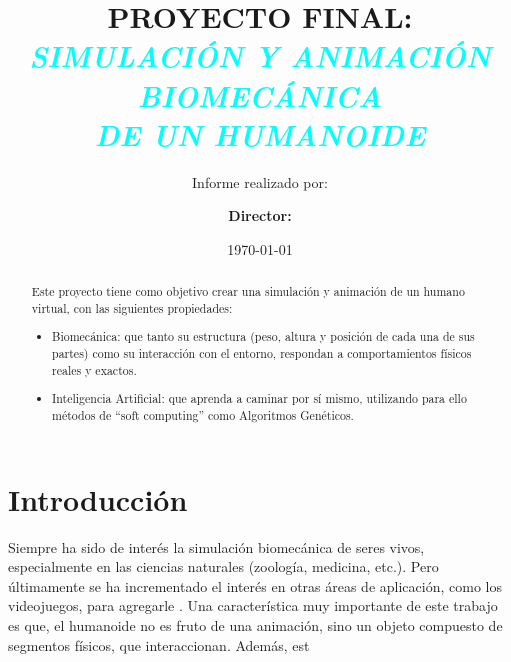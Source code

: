 \documentclass{article}
\title{\textbf{PROYECTO FINAL: \\ \vspace*{2ex} \textcolor{cyan}{\textit{SIMULACI\'ON Y ANIMACI\'ON BIOMEC\'ANICA \\DE UN HUMANOIDE}  }  \vspace*{3ex}} } %
\author{Informe realizado por: }
\affil{Altamiranda Graterol, Enzo\\%
\url{ealtamir@itba.edu.ar}}
\affil{Fontanella De Santis, Teresa\\
\url{tfontane@itba.edu.ar}}
\affil{Mehdi, Tom\'as\\
\url{tmehdi@itba.edu.ar}\vspace*{3ex}}
\author{\textbf{Director:}}
\affil{ \textbf{Dr. PARISI, Daniel Ricardo} \vspace*{3ex}}
\date{\today} %
\begin{document}

\maketitle %
\thispagestyle{empty} %

\newpage
\tableofcontents
\newpage

 \begin{abstract}
 
\noindent

\begin{adjustwidth}{1.05cm}{0cm}
Este proyecto tiene como objetivo crear una simulaci\'on y animaci\'on de un humano virtual, con las siguientes propiedades:
\begin{itemize}[leftmargin=5.5mm]
\item Biomec\'anica: que tanto su estructura (peso, altura y posici\'on de cada una de sus partes) como su interacci\'on con el entorno, respondan a comportamientos f\'isicos reales y exactos.
\item Inteligencia Artificial: que aprenda a caminar por s\'i mismo, utilizando para ello m\'etodos de ``soft computing'' como Algoritmos Gen\'eticos.
\end{itemize}

\end{adjustwidth}

 \end{abstract}



\section{Introducci\'on}

\begin{adjustwidth}{1cm}{0cm}
Siempre ha sido de inter\'es la simulaci\'on biomec\'anica de seres vivos, especialmente en las ciencias naturales (zoolog\'ia, medicina, etc.). Pero \'ultimamente se ha incrementado el inter\'es en otras \'areas de aplicaci\'on, como los videojuegos, para agregarle  .
Una caracter\'istica muy importante de este trabajo es que, el humanoide no es fruto de una animaci\'on, sino  un objeto compuesto de segmentos f\'isicos, que interaccionan. Adem\'as, est  
\end{adjustwidth}
\end{document}
